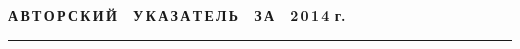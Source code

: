 
\def\stat{cont}
{%
\raggedleft\Large \bf%
А\,В\,Т\,О\,Р\,С\,К\,И\,Й\ \ У\,К\,А\,З\,А\,Т\,Е\,Л\,Ь\ \ З\,А\ \ 2\,0\,1\,4 г. \vskip 17pt
    \hrule
    \par
{} }

\label{st\stat}

\def\tit{\ }

\def\aut{\ }
\def\auf{\ }

\def\leftkol{\ } %

\def\rightkol{\ } %

\titele{\tit}{\aut}{\auf}{\leftkol}{\rightkol}

\vspace*{-12pt}
\vspace*{-12pt}

